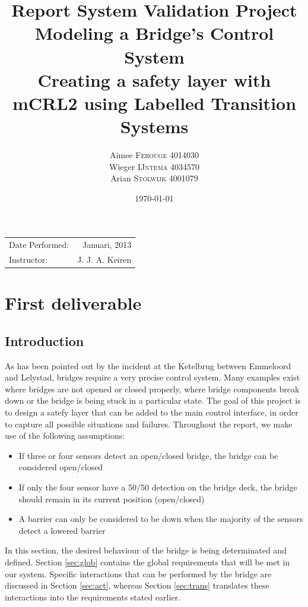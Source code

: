 \documentclass{article}
\title{Report System Validation Project \\ Modeling a Bridge's Control System\\ Creating a safety layer with mCRL2 using Labelled Transition Systems} %
\author{Aimee \textsc{Ferouge} 4014030 \\Wieger \textsc{IJntema} 4034570 \\Arian \textsc{Stolwijk} 4001079} %
\date{\today} %
\begin{document}
\maketitle %

\begin{center}
\begin{tabular}{l r}
Date Performed: & Januari, 2013 \\ %
Instructor: & J. J. A. Keiren %
\end{tabular}
\end{center}





\section{First deliverable}
\subsection{Introduction}

As has been pointed out by the incident at the Ketelbrug between Emmeloord and Lelystad, bridges require a very precise control system.  Many examples exist where bridges are not opened or closed properly, where bridge components break down or the bridge is being stuck in a particular state. The goal of this project is to design a satefy layer that can be added to the main control interface, in order to capture all possible situations and failures.
Throughout the report, we make use of the following assumptions:
%
\begin{itemize}
	\item If three or four sensors detect an open/closed bridge, the bridge can be considered open/closed
	\item If only the four sensor have a 50/50 detection on the bridge deck, the bridge should remain in its current position (open/closed)
	\item A barrier can only be considered to be down when the majority of the sensors detect a lowered barrier
\end{itemize}
%
In this section, the desired behaviour of the bridge is being determinated and defined. Section \ref{sec:glob} contains the global requirements that will be met in our system. Specific interactions that can be performed by the bridge are discussed in Section \ref{sec:act}, whereas Section \ref{sec:trans} translates these interactions into the requirements stated earlier.
\end{document}
